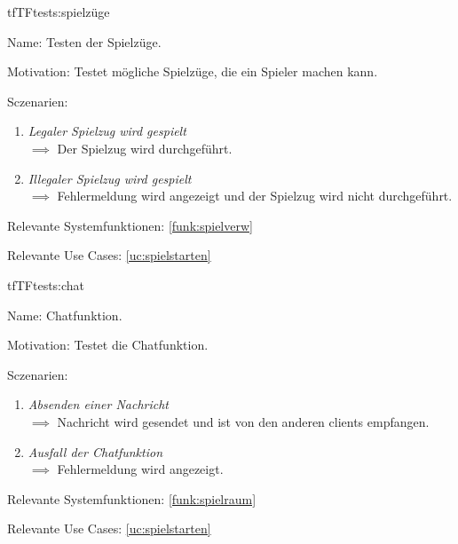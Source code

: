 \begin{description}[leftmargin=5em, style=sameline]
\begin{lhp}{tf}{TF}{tests:spielzüge}
	\item [Name:] Testen der Spielzüge.
	\item [Motivation:] Testet mögliche Spielzüge, die ein Spieler machen kann.
	\item [Sczenarien:] \hfill
		\begin{enumerate}
			\item \textit{Legaler Spielzug wird gespielt} \\ $\implies$ Der Spielzug wird durchgeführt.
			\item \textit{Illegaler Spielzug wird gespielt} \\ $\implies$ Fehlermeldung wird angezeigt und der Spielzug wird nicht durchgeführt.
		\end{enumerate}
	\item [Relevante Systemfunktionen:] \ref{funk:spielverw}
	\item [Relevante Use Cases:] \ref{uc:spielstarten}
\end{lhp}

\begin{lhp}{tf}{TF}{tests:chat}
	\item [Name:] Chatfunktion.
	\item [Motivation:] Testet die Chatfunktion.
	\item [Sczenarien:] \hfill
		\begin{enumerate}
			\item \textit{Absenden einer Nachricht} \\ $\implies$ Nachricht wird gesendet und ist von den anderen clients empfangen.
			\item \textit{Ausfall der Chatfunktion} \\ $\implies$ Fehlermeldung wird angezeigt.
		\end{enumerate}
	\item [Relevante Systemfunktionen:] \ref{funk:spielraum}
	\item [Relevante Use Cases:] \ref{uc:spielstarten}
\end{lhp}


\end{description}
